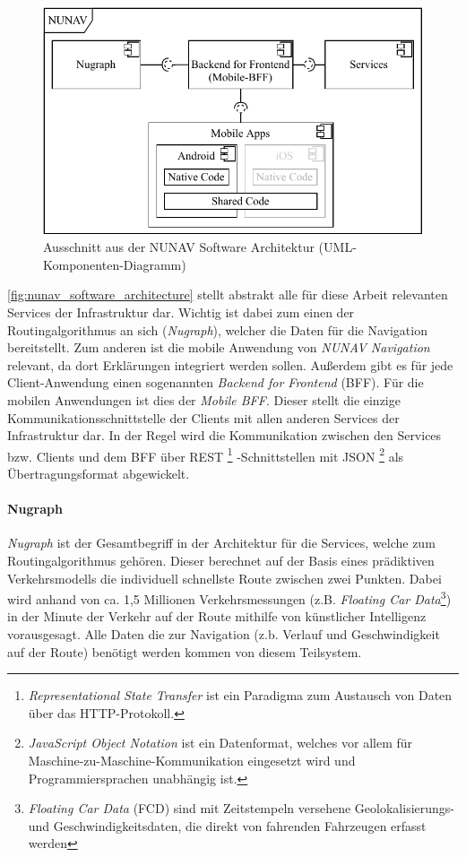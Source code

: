 \begin{figure}[htb!]
    \centering
    \includegraphics[width=\textwidth]{contents/06_model_evaluation/01_integration/res/nunav_architecture.pdf}
    \caption{Ausschnitt aus der NUNAV Software Architektur (UML-Komponenten-Diagramm)}
    \label{fig:nunav_software_architecture}
\end{figure}

\autoref{fig:nunav_software_architecture} stellt abstrakt alle für diese Arbeit relevanten Services der Infrastruktur dar. Wichtig ist dabei zum einen der Routingalgorithmus an sich (\textit{Nugraph}), welcher die Daten für die Navigation bereitstellt. Zum anderen ist die mobile Anwendung von \textit{NUNAV Navigation} relevant, da dort Erklärungen integriert werden sollen. Außerdem gibt es für jede Client-Anwendung einen sogenannten \textit{Backend for Frontend} (BFF). Für die mobilen Anwendungen ist dies der \textit{Mobile BFF}. Dieser stellt die einzige Kommunikationsschnittstelle der Clients mit allen anderen Services der Infrastruktur dar. In der Regel wird die Kommunikation zwischen den Services bzw. Clients und dem BFF über REST
\footnote{\textit{Representational State Transfer} ist ein Paradigma zum Austausch von Daten über das HTTP-Protokoll.}
-Schnittstellen mit JSON
\footnote{\textit{JavaScript Object Notation} ist ein Datenformat, welches vor allem für Maschine-zu-Maschine-Kommunikation eingesetzt wird und Programmiersprachen unabhängig ist.}
als Übertragungsformat abgewickelt. 

\paragraph{Nugraph} \textit{Nugraph} ist der Gesamtbegriff in der Architektur für die Services, welche zum Routingalgorithmus gehören. Dieser berechnet auf der Basis eines prädiktiven Verkehrsmodells die individuell schnellste Route zwischen zwei Punkten. Dabei wird anhand von ca. 1,5 Millionen Verkehrsmessungen
 (z.B. \textit{Floating Car Data}\footnote{\textit{Floating Car Data} (FCD) sind mit Zeitstempeln versehene Geolokalisierungs- und Geschwindigkeitsdaten, die direkt von fahrenden Fahrzeugen erfasst werden})
 in der Minute der Verkehr auf der Route mithilfe von künstlicher Intelligenz vorausgesagt. Alle Daten die zur Navigation (z.b. Verlauf und Geschwindigkeit auf der Route) benötigt werden kommen von diesem Teilsystem.

